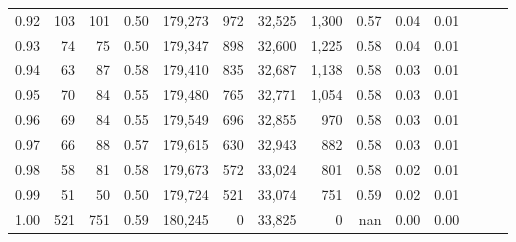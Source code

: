 \begin{tabular}{rrrrrrrrrrrrrr}
0.92 &    103 &  101 &  0.50 &  179,273 &      972 &  32,525 &   1,300 &  0.57 &  0.04 &      0.01 \\
0.93 &     74 &   75 &  0.50 &  179,347 &      898 &  32,600 &   1,225 &  0.58 &  0.04 &      0.01 \\
0.94 &     63 &   87 &  0.58 &  179,410 &      835 &  32,687 &   1,138 &  0.58 &  0.03 &      0.01 \\
0.95 &     70 &   84 &  0.55 &  179,480 &      765 &  32,771 &   1,054 &  0.58 &  0.03 &      0.01 \\
0.96 &     69 &   84 &  0.55 &  179,549 &      696 &  32,855 &     970 &  0.58 &  0.03 &      0.01 \\
0.97 &     66 &   88 &  0.57 &  179,615 &      630 &  32,943 &     882 &  0.58 &  0.03 &      0.01 \\
0.98 &     58 &   81 &  0.58 &  179,673 &      572 &  33,024 &     801 &  0.58 &  0.02 &      0.01 \\
0.99 &     51 &   50 &  0.50 &  179,724 &      521 &  33,074 &     751 &  0.59 &  0.02 &      0.01 \\
1.00 &    521 &  751 &  0.59 &  180,245 &        0 &  33,825 &       0 &   nan &  0.00 &      0.00 \\
\bottomrule
\end{tabular}
